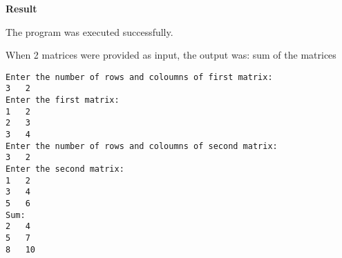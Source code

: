 \vspace{0.5cm}
\textbf{Result}
\vspace{0.5cm}

The program was executed successfully. 

When 2 matrices were provided as input, the output was: sum of the matrices
\begin{verbatim}
Enter the number of rows and coloumns of first matrix: 
3	2
Enter the first matrix: 
1	2
2	3
3	4
Enter the number of rows and coloumns of second matrix: 
3	2 
Enter the second matrix: 
1	2
3	4
5	6
Sum: 
2	4	
5	7	
8	10
\end{verbatim}

